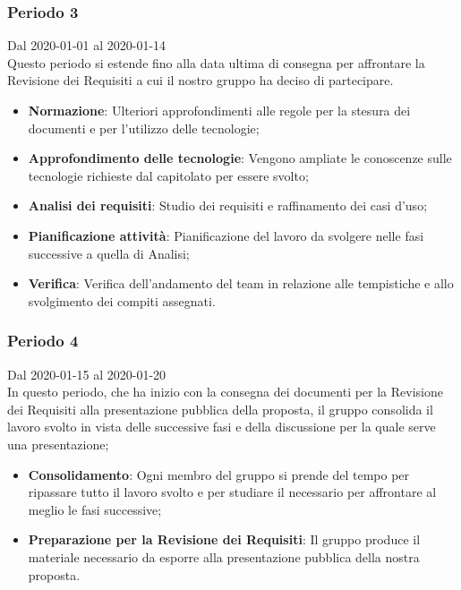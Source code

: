 \subsubsection{Periodo 3}
 Dal 2020-01-01 al 2020-01-14\\
 Questo periodo si estende fino alla data ultima di consegna per affrontare la Revisione dei Requisiti a cui il nostro gruppo ha deciso di partecipare.\\
 \begin{itemize}
	\item \textbf{Normazione}: Ulteriori approfondimenti alle regole per la stesura dei documenti e per l'utilizzo delle tecnologie;
	\item \textbf{Approfondimento delle tecnologie}: Vengono ampliate le conoscenze sulle tecnologie richieste dal capitolato per essere svolto;
	\item \textbf{Analisi dei requisiti}: Studio dei requisiti e raffinamento dei casi d'uso;
	\item \textbf{Pianificazione attività}: Pianificazione del lavoro da svolgere nelle fasi successive a quella di Analisi;
	\item \textbf{Verifica}: Verifica dell'andamento del team in relazione alle tempistiche e allo svolgimento dei compiti assegnati.

 \end{itemize}
\subsubsection{Periodo 4} 
Dal 2020-01-15 al 2020-01-20\\
In questo periodo, che ha inizio con la consegna dei documenti per la Revisione dei Requisiti alla presentazione pubblica della proposta, il gruppo consolida il lavoro svolto in vista delle successive fasi e della discussione per la quale serve una presentazione;
\begin{itemize}
	\item \textbf{Consolidamento}: Ogni membro del gruppo si prende del tempo per ripassare tutto il lavoro svolto e per studiare il necessario per affrontare al meglio le fasi successive;
	\item \textbf{Preparazione per la Revisione dei Requisiti}: Il gruppo produce il materiale necessario da esporre alla presentazione pubblica della nostra proposta.
\end{itemize}

